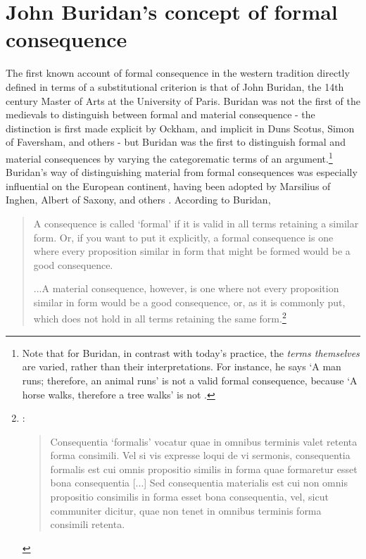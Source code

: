 \documentclass[]{article}
\begin{document}
\section{John Buridan's concept of formal consequence}
The first known account of formal consequence in the western tradition directly defined in terms of a substitutional criterion is that of John Buridan, the 14th century Master of Arts at the University of Paris. Buridan was not the first of the medievals to distinguish between formal and material consequence - the distinction is first made explicit by Ockham, and implicit in Duns Scotus, Simon of Faversham, and others - but Buridan was the first to distinguish formal and material consequences by varying the categorematic terms of an argument.\footnote{Note that for Buridan, in contrast with today's practice, the \textit{terms themselves} are varied, rather than their interpretations. For instance, he says `A man runs; therefore, an animal runs' is not a valid formal consequence, because `A horse walks, therefore a tree walks' is not \cite[TC 1.4.3]{Buridan2015}.} Buridan's way of distinguishing material from formal consequences was especially influential on the European continent, having been adopted by Marsilius of Inghen, Albert of Saxony, and others \cite[sec. 3.3]{DutilhNovaes2012a}. According to Buridan, 

\begin{quote}
A consequence is called `formal' if it is valid in all terms retaining a similar form. Or, if you want to put it explicitly, a formal consequence is one where every proposition similar in form that might be formed would be a good consequence.

...A material consequence, however, is one where not every proposition similar in form would be a good consequence, or, as it is commonly put, which does not hold in all terms retaining the same form.\footnote{\cite[TC 1.4.2-3]{Buridan2015}: 

\begin{quote}
Consequentia `formalis' vocatur quae in omnibus terminis valet retenta forma consimili. Vel si vis expresse loqui de vi sermonis, consequentia formalis est cui omnis propositio similis in forma quae formaretur esset bona consequentia [...] Sed consequentia materialis est cui non omnis propositio consimilis in forma esset bona consequentia, vel, sicut communiter dicitur, quae non tenet in omnibus terminis forma consimili retenta.
\end{quote}}

\end{quote}
\end{document}
